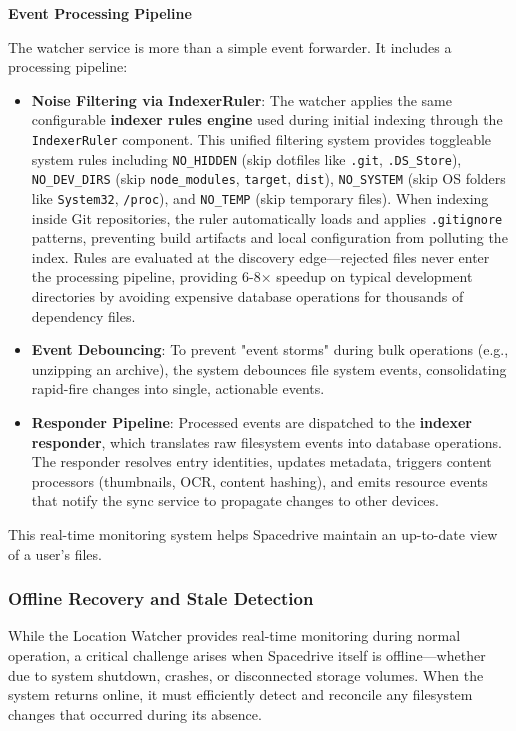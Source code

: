 \documentclass[sigconf]{acmart}
\begin{document}
\textbf{Event Processing Pipeline}

The watcher service is more than a simple event forwarder. It includes a processing pipeline:

\begin{itemize}[noitemsep, topsep=0pt]
 \item \textbf{Noise Filtering via IndexerRuler}: The watcher applies the same configurable \textbf{indexer rules engine} used during initial indexing through the \texttt{IndexerRuler} component. This unified filtering system provides toggleable system rules including \texttt{NO\_HIDDEN} (skip dotfiles like \texttt{.git}, \texttt{.DS\_Store}), \texttt{NO\_DEV\_DIRS} (skip \texttt{node\_modules}, \texttt{target}, \texttt{dist}), \texttt{NO\_SYSTEM} (skip OS folders like \texttt{System32}, \texttt{/proc}), and \texttt{NO\_TEMP} (skip temporary files). When indexing inside Git repositories, the ruler automatically loads and applies \texttt{.gitignore} patterns, preventing build artifacts and local configuration from polluting the index. Rules are evaluated at the discovery edge---rejected files never enter the processing pipeline, providing 6-8× speedup on typical development directories by avoiding expensive database operations for thousands of dependency files.

 \item \textbf{Event Debouncing}: To prevent "event storms" during bulk operations (e.g., unzipping an archive), the system debounces file system events, consolidating rapid-fire changes into single, actionable events.

 \item \textbf{Responder Pipeline}: Processed events are dispatched to the \textbf{indexer responder}, which translates raw filesystem events into database operations. The responder resolves entry identities, updates metadata, triggers content processors (thumbnails, OCR, content hashing), and emits resource events that notify the sync service to propagate changes to other devices.
\end{itemize}

This real-time monitoring system helps Spacedrive maintain an up-to-date view of a user's files.

\subsubsection{Offline Recovery and Stale Detection}
\label{sec:offline-recovery}

While the Location Watcher provides real-time monitoring during normal operation, a critical challenge arises when Spacedrive itself is offline---whether due to system shutdown, crashes, or disconnected storage volumes. When the system returns online, it must efficiently detect and reconcile any filesystem changes that occurred during its absence.
\end{document}
